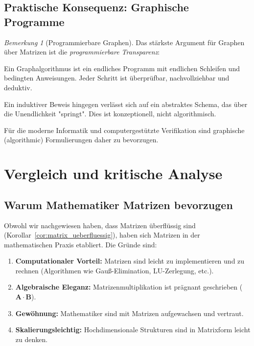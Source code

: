 \documentclass[12pt, a4paper]{article}
\theoremstyle{definition}
\theoremstyle{remark}
\newtheorem{remark}[theorem]{Bemerkung}
\newcommand{\vA}{\bm{A}}
\newcommand{\vB}{\bm{B}}
\begin{document}
\subsection{Praktische Konsequenz: Graphische Programme}
\label{subsec:praktische_konsequenz}

\begin{remark}[Programmierbare Graphen]
\label{rem:programmierbare_graphen}
Das stärkste Argument für Graphen über Matrizen ist die \emph{programmierbare Transparenz}:

Ein Graphalgorithmus ist ein endliches Programm mit endlichen Schleifen und bedingten Anweisungen. Jeder Schritt ist überprüfbar, nachvollziehbar und deduktiv.

Ein induktiver Beweis hingegen verlässt sich auf ein abstraktes Schema, das über die Unendlichkeit "springt". Dies ist konzeptionell, nicht algorithmisch.

Für die moderne Informatik und computergestützte Verifikation sind graphische (algorithmic) Formulierungen daher zu bevorzugen.
\end{remark}

\section{Vergleich und kritische Analyse}
\label{sec:kritische_analyse}

\subsection{Warum Mathematiker Matrizen bevorzugen}
\label{subsec:warum_matrizen}

Obwohl wir nachgewiesen haben, dass Matrizen überflüssig sind (Korollar~\ref{cor:matrix_ueberfluessig}), haben sich Matrizen in der mathematischen Praxis etabliert. Die Gründe sind:

\begin{enumerate}[label=(\alph*)]
  \item \textbf{Computationaler Vorteil:} Matrizen sind leicht zu implementieren und zu rechnen (Algorithmen wie Gauß-Elimination, LU-Zerlegung, etc.).
  \item \textbf{Algebraische Eleganz:} Matrizenmultiplikation ist prägnant geschrieben ($\vA \cdot \vB$).
  \item \textbf{Gewöhnung:} Mathematiker sind mit Matrizen aufgewachsen und vertraut.
  \item \textbf{Skalierungsleichtig:} Hochdimensionale Strukturen sind in Matrixform leicht zu denken.
\end{enumerate}
\end{document}
